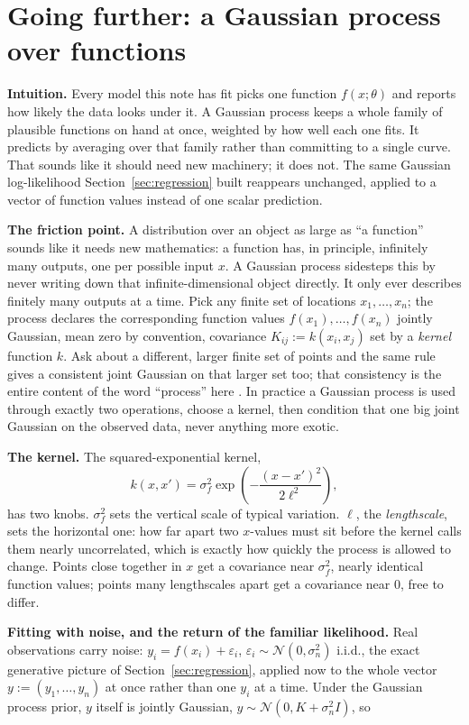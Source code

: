 \documentclass[11pt]{article}
\begin{document}
\clearpage

\section{Going further: a Gaussian process over functions}
\label{sec:gp}

\textbf{Intuition.} Every model this note has fit picks one function
$f(x;\theta)$ and reports how likely the data looks under it. A
Gaussian process keeps a whole family of plausible functions on hand
at once, weighted by how well each one fits. It predicts by averaging
over that family rather than committing to a single curve. That
sounds like it should need new machinery; it does not. The same
Gaussian log-likelihood Section~\ref{sec:regression} built reappears
unchanged, applied to a vector of function values instead of one
scalar prediction.

\textbf{The friction point.} A distribution over an object as large as
``a function'' sounds like it needs new mathematics: a function has,
in principle, infinitely many outputs, one per possible input $x$. A
Gaussian process sidesteps this by never writing down that
infinite-dimensional object directly. It only ever describes finitely
many outputs at a time. Pick any finite set of locations
$x_1,\dots,x_n$; the process declares the corresponding function
values $f(x_1),\dots,f(x_n)$ jointly Gaussian, mean zero by
convention, covariance $K_{ij} := k(x_i,x_j)$ set by a \emph{kernel}
function $k$. Ask about a different, larger finite set of points and
the same rule gives a consistent joint Gaussian on that larger set
too; that consistency is the entire content of the word ``process''
here \citep{rasmussen2006}. In practice a Gaussian process is used
through exactly two operations, choose a kernel, then condition that
one big joint Gaussian on the observed data, never anything more
exotic.

\textbf{The kernel.} The squared-exponential kernel,
$$k(x,x') = \sigma_f^2 \exp\!\left(-\frac{(x-x')^2}{2\ell^2}\right),$$
has two knobs. $\sigma_f^2$ sets the vertical scale of typical
variation. $\ell$, the \emph{lengthscale}, sets the horizontal one:
how far apart two $x$-values must sit before the kernel calls them
nearly uncorrelated, which is exactly how quickly the process is
allowed to change. Points close together in $x$ get a covariance near
$\sigma_f^2$, nearly identical function values; points many
lengthscales apart get a covariance near $0$, free to differ.

\textbf{Fitting with noise, and the return of the familiar
likelihood.} Real observations carry noise: $y_i = f(x_i) +
\varepsilon_i$, $\varepsilon_i \sim \mathcal N(0,\sigma_n^2)$ i.i.d.,
the exact generative picture of Section~\ref{sec:regression}, applied
now to the whole vector $y := (y_1,\dots,y_n)$ at once rather than one
$y_i$ at a time. Under the Gaussian process prior, $y$ itself is
jointly Gaussian, $y \sim \mathcal N(0, K + \sigma_n^2 I)$, so
\end{document}
